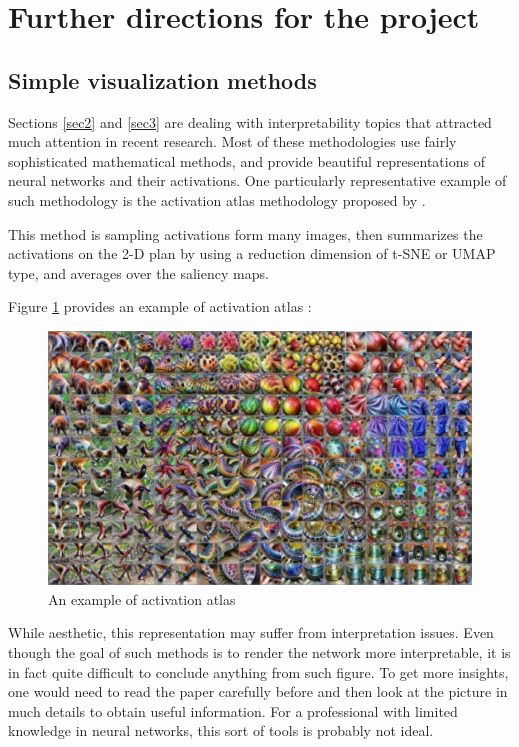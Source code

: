 \section{Further directions for the project}
\label{sec4}


\subsection{Simple visualization methods}
\label{subsec41}

Sections \ref{sec2} and \ref{sec3} are dealing with interpretability topics that attracted much attention in recent research. Most of these methodologies use fairly sophisticated mathematical methods, and provide beautiful representations of neural networks and their activations. One particularly representative example of such methodology is the activation atlas methodology proposed by \cite{Carter2019}.

This method is sampling activations form many images, then summarizes the activations on the 2-D plan by using a reduction dimension of t-SNE or UMAP type, and averages over the saliency maps.

Figure \ref{im_sec4_1} provides an example of activation atlas :

\begin{figure}[H]
	\centering
	\includegraphics[width=\linewidth]{images/image2.png}
	\caption{An example of activation atlas}
	\label{im_sec4_1}
\end{figure}

While aesthetic, this representation may suffer from interpretation issues. Even though the goal of such methods is to render the network more interpretable, it is in fact quite difficult to conclude anything from such figure. To get more insights, one would need to read the paper carefully before and then look at the picture in much details to obtain useful information. For a professional with limited knowledge in neural networks, this sort of tools is probably not ideal.

